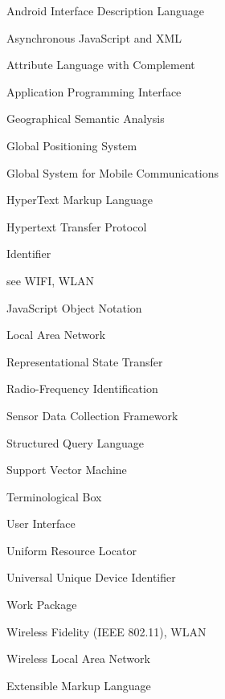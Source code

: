 \documentclass[external]{20120615_deliverable_template_ukob}
\theoremstyle{definition}
\begin{document}
\begin{LGAbbreviations}


{Android Interface Description Language}

{Asynchronous JavaScript and XML}

{Attribute Language with Complement}

{Application Programming Interface}

{Geographical Semantic Analysis}

{Global Positioning System}

{Global System for Mobile Communications}

{HyperText Markup Language}

{Hypertext Transfer Protocol}

{Identifier}

{see WIFI, WLAN}

{JavaScript Object Notation}

{Local Area Network}

{Representational State Transfer}

{Radio-Frequency Identification}

{Sensor Data Collection Framework}

{Structured Query Language}

{Support Vector Machine}

{Terminological Box}

{User Interface}

{Uniform Resource Locator}

{Universal Unique Device Identifier}

{Work Package}

{Wireless Fidelity (IEEE 802.11), WLAN}

{Wireless Local Area Network}

{Extensible Markup Language}

\LGaddabbreviation{~\\}
{~~~}

\end{LGAbbreviations}
\end{document}
